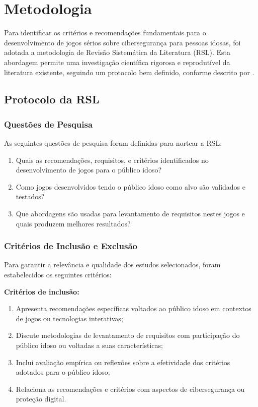 \chapter{Metodologia}
\label{cap:metodologia}

Para identificar os critérios e recomendações fundamentais para o desenvolvimento de jogos sérios sobre cibersegurança para pessoas idosas, foi adotada a metodologia de Revisão Sistemática da Literatura (RSL). Esta abordagem permite uma investigação científica rigorosa e reprodutível da literatura existente, seguindo um protocolo bem definido, conforme descrito por \cite{kitchenham2004procedures}.

\section{Protocolo da RSL}\label{sec:protocolo_rsl}

\subsection{Questões de Pesquisa}\label{subsec:questoes_pesquisa}

As seguintes questões de pesquisa foram definidas para nortear a RSL:
\begin{enumerate}
    \item Quais as recomendações, requisitos, e critérios identificados no desenvolvimento de jogos para o público idoso?
    \item Como jogos desenvolvidos tendo o público idoso como alvo são validados e testados?
    \item Que abordagens são usadas para levantamento de requisitos nestes jogos e quais produzem melhores resultados?
\end{enumerate}

\subsection{Critérios de Inclusão e Exclusão}\label{subsec:criterios}

Para garantir a relevância e qualidade dos estudos selecionados, foram estabelecidos os seguintes critérios:

\textbf{Critérios de inclusão:}
\begin{enumerate}
    \item Apresenta recomendações específicas voltados ao público idoso em contextos de jogos ou tecnologias interativas;
    \item Discute metodologias de levantamento de requisitos com participação do público idoso ou voltadas a suas características;
    \item Inclui avaliação empírica ou reflexões sobre a efetividade dos critérios adotados para o público idoso;
    \item Relaciona as recomendações e critérios com aspectos de cibersegurança ou proteção digital.
\end{enumerate}


